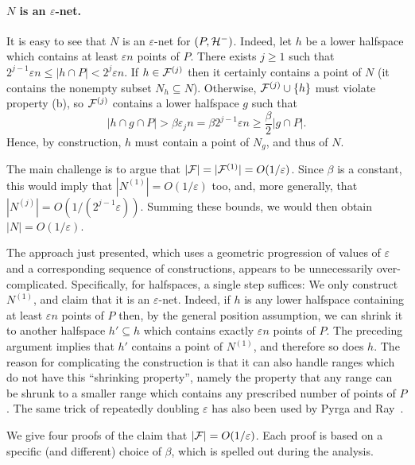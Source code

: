 \documentclass[12pt]{article}
\newcommand{\eps}{{\varepsilon}}
\def\F{{\cal F}}
\newcommand{\CalH}{{\cal H}}
\begin{document}
\paragraph{$N$ is an $\eps$-net.}
It is easy to see that $N$ is an $\eps$-net for $(P,\CalH^-)$.
Indeed, let $h$ be a lower halfspace which contains at least $\eps n$
points of $P$. There exists $j\ge 1$ such that $2^{j-1}\eps n\le
|h\cap P| < 2^j\eps n$.  If $h\in\F^{(j)}$ then it certainly contains
a point of $N$ (it contains the nonempty subset $N_h\subseteq N$).
Otherwise, $\F^{(j)}\cup\{h\}$ must violate property (b), so
$\F^{(j)}$ contains a lower halfspace $g$ such that
$$
|h\cap g\cap P| > \beta\eps_j n = \beta 2^{j-1}\eps n \ge
\frac{\beta}{2} |g\cap P| .
$$
Hence, by construction, $h$ must contain a point of $N_g$,
and thus of $N$.

The main challenge is to argue that $|\F|=|\F^{(1)}| = O(1/\eps)$.
Since $\beta$ is a constant, this would imply that
$|N^{(1)}|=O(1/\eps)$ too, and, more generally, that
$|N^{(j)}|=O(1/(2^{j-1}\eps))$. Summing these bounds, we would
then obtain $|N|=O(1/\eps)$.

\medskip

The approach just presented, which uses a geometric progression of
values of $\eps$ and a corresponding sequence of constructions,
appears to be unnecessarily over-complicated.  Specifically, for
halfspaces, a single step suffices: We only construct $N^{(1)}$, and
claim that it is an $\eps$-net. Indeed, if $h$ is any lower halfspace
containing at least $\eps n$ points of $P$ then, by the general position 
assumption, we can shrink it to
another halfspace $h'\subseteq h$ which contains exactly $\eps n$
points of $P$. The preceding argument implies that $h'$ contains a
point of $N^{(1)}$, and therefore so does $h$. The reason for
complicating the construction is that it can also handle ranges which
do not have this ``shrinking property'', namely the property that any
range can be shrunk to a smaller range which contains any prescribed
number of points of $P$.  The same trick of repeatedly doubling $\eps$
has also been used by Pyrga and Ray~\cite{pr-nepen-08}.

\medskip

We give four proofs of the claim that $|\F|=O(1/\eps)$.
Each proof is based on a specific (and different) choice of $\beta$,
which is spelled out during the analysis.
\end{document}
